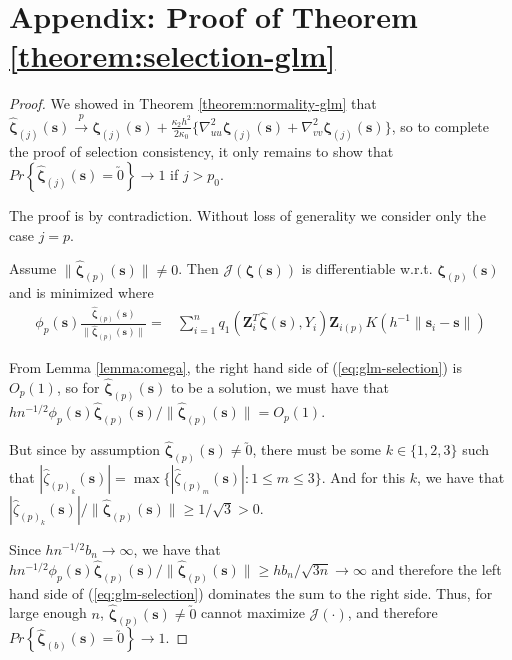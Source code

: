 \documentclass[12pt,english,authoryear, review]{article}\usepackage[]{graphicx}\usepackage[]{color}
\theoremstyle{plain}
\theoremstyle{plain}
\begin{document}
\section*{Appendix: Proof of Theorem \ref{theorem:selection-glm}}
\begin{proof}
We showed in Theorem \ref{theorem:normality-glm} that $\hat{\bm{\zeta}}_{\left(j\right)}\left(\bm{s}\right)\xrightarrow{p}\bm{\zeta}_{\left(j\right)}\left(\bm{s}\right)+\frac{\kappa_{2}h^{2}}{2\kappa_{0}}\{\nabla_{uu}^{2}\bm{\zeta}_{\left(j\right)}\left(\bm{s}\right)+\nabla_{vv}^{2}\bm{\zeta}_{\left(j\right)}\left(\bm{s}\right)\}$,
so to complete the proof of selection consistency, it only remains
to show that $Pr\left\{ \hat{\bm{\zeta}}_{\left(j\right)}\left(\bm{s}\right)=\utilde{0}\right\} \to1$
if $j>p_{0}$.

The proof is by contradiction. Without loss of generality we consider
only the case $j=p$.

Assume $\|\hat{\bm{\zeta}}_{\left(p\right)}(\bm{s})\|\ne0$. Then
$\mathcal{J}\left(\bm{\zeta}\left(\bm{s}\right)\right)$ is differentiable
w.r.t. $\bm{\zeta}_{\left(p\right)}\left(\bm{s}\right)$ and is minimized
where 
\begin{align}
\phi_{p}(\bm{s})\frac{\hat{\bm{\zeta}}_{\left(p\right)}\left(\bm{s}\right)}{\|\hat{\bm{\zeta}}_{\left(p\right)}\left(\bm{s}\right)\|}= & \sum_{i=1}^{n}q_{1}\left(\bm{Z}_{i}^{T}\hat{\bm{\zeta}}\left(\bm{s}\right),Y_{i}\right)\bm{Z}_{i\left(p\right)}K\left(h^{-1}\|\bm{s}_{i}-\bm{s}\|\right)\label{eq:glm-selection}
\end{align}


From Lemma \ref{lemma:omega}, the right hand side of (\ref{eq:glm-selection})
is $O_{p}\left(1\right)$, so for $\hat{\bm{\zeta}}_{\left(p\right)}\left(\bm{s}\right)$
to be a solution, we must have that $hn^{-1/2}\phi_{p}\left(\bm{s}\right)\hat{\bm{\zeta}}_{\left(p\right)}\left(\bm{s}\right)/\|\hat{\bm{\zeta}}_{\left(p\right)}\left(\bm{s}\right)\|=O_{p}\left(1\right)$.

But since by assumption $\hat{\bm{\zeta}}_{\left(p\right)}\left(\bm{s}\right)\ne\utilde{0}$,
there must be some $k\in\{1,2,3\}$ such that $|\hat{\zeta}_{\left(p\right)_{k}}\left(\bm{s}\right)|=\max\{|\hat{\zeta}_{\left(p\right)_{m}}\left(\bm{s}\right)|:1\le m\le3\}$.
And for this $k$, we have that $|\hat{\zeta}_{\left(p\right)_{k}}\left(\bm{s}\right)|/\|\hat{\bm{\zeta}}_{\left(p\right)}\left(\bm{s}\right)\|\ge1/\sqrt{3}>0$.

Since $hn^{-1/2}b_{n}\to\infty$, we have that $hn^{-1/2}\phi_{p}\left(\bm{s}\right)\hat{\bm{\zeta}}_{\left(p\right)}\left(\bm{s}\right)/\|\hat{\bm{\zeta}}_{\left(p\right)}\left(\bm{s}\right)\|\ge hb_{n}/\sqrt{3n}\to\infty$
and therefore the left hand side of (\ref{eq:glm-selection}) dominates
the sum to the right side. Thus, for large enough $n$, $\hat{\bm{\zeta}}_{\left(p\right)}\left(\bm{s}\right)\ne\utilde{0}$
cannot maximize $\mathcal{J}\left(\cdot\right)$, and therefore $Pr\left\{ \hat{\bm{\zeta}}_{\left(b\right)}\left(\bm{s}\right)=\utilde{0}\right\} \to1$. 
\end{proof}
\end{document}
